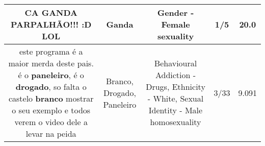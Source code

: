 \documentclass[11pt]{article}
\newlength\mylength
\begin{document}
\begin{center}
\begin{longtable}{|C{.65\mylength}|C{.30\mylength}|C{.12\mylength}|C{.12\mylength}|C{.12\mylength}|}
  \small CA \textbf{GANDA} PARPALHÃO!!! :D LOL\normalsize   & Ganda & Gender - Female sexuality & 1/5 & 20.0 \\  \hline
  \small este programa é a maior merda deste pais. é o \textbf{paneleiro}, é o \textbf{drogado}, so falta o castelo \textbf{branco} mostrar o seu exemplo e todos verem o video dele a levar na peida\normalsize   & Branco, Drogado, Paneleiro & Behavioural Addiction - Drugs, Ethnicity - White, Sexual Identity - Male homosexuality & 3/33 & 9.091 \\  \hline
  
\end{longtable}
\end{center}
\end{document}
